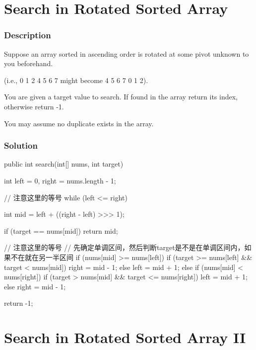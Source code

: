 \newpage

\section{Search in Rotated Sorted Array} %

\subsubsection{Description}
Suppose an array sorted in ascending order is rotated at some pivot unknown to you beforehand.

(i.e., 0 1 2 4 5 6 7 might become 4 5 6 7 0 1 2).

You are given a target value to search. If found in the array return its index, otherwise return -1.

You may assume no duplicate exists in the array.

\subsubsection{Solution}

\begin{Code}
public int search(int[] nums, int target) {
    int left = 0, right = nums.length - 1;

    // 注意这里的等号
    while (left <= right) {
        int mid = left + ((right - left) >>> 1);

        if (target == nums[mid]) {
            return mid;
        }

        // 注意这里的等号
        // 先确定单调区间，然后判断target是不是在单调区间内，如果不在就在另一半区间
        if (nums[mid] >= nums[left]) {
            if (target >= nums[left] && target < nums[mid]) {
                right = mid - 1;
            } else {
                left = mid + 1;
            }
        } else if (nums[mid] < nums[right]) {
            if (target > nums[mid] && target <= nums[right]) {
                left = mid + 1;
            } else {
                right = mid - 1;
            }
        }
    }

    return -1;
}
\end{Code}

\newpage

\section{Search in Rotated Sorted Array II} %

